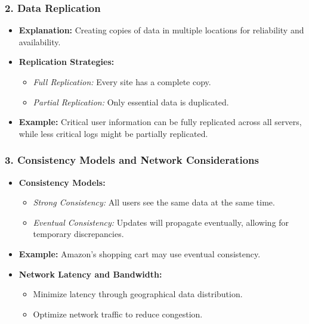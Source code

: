 \documentclass[aspectratio=169]{beamer}
\begin{document}
\begin{frame}[fragile]
    \frametitle{2. Data Replication}
    \begin{itemize}
        \item \textbf{Explanation:} Creating copies of data in multiple locations for reliability and availability.
        \item \textbf{Replication Strategies:}
            \begin{itemize}
                \item \textit{Full Replication:} Every site has a complete copy.
                \item \textit{Partial Replication:} Only essential data is duplicated.
            \end{itemize}
        \item \textbf{Example:} Critical user information can be fully replicated across all servers, while less critical logs might be partially replicated.
    \end{itemize}
\end{frame}

\begin{frame}[fragile]
    \frametitle{3. Consistency Models and Network Considerations}
    \begin{itemize}
        \item \textbf{Consistency Models:}
            \begin{itemize}
                \item \textit{Strong Consistency:} All users see the same data at the same time.
                \item \textit{Eventual Consistency:} Updates will propagate eventually, allowing for temporary discrepancies.
            \end{itemize}
        \item \textbf{Example:} Amazon's shopping cart may use eventual consistency.
        \item \textbf{Network Latency and Bandwidth:}
            \begin{itemize}
                \item Minimize latency through geographical data distribution.
                \item Optimize network traffic to reduce congestion.
            \end{itemize}
    \end{itemize}
\end{frame}
\end{document}
